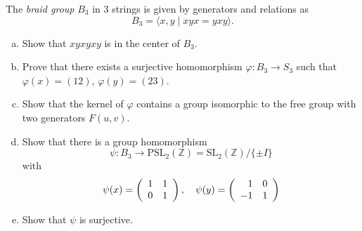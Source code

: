 \documentclass{article}
\newcounter{Problem}
\newenvironment{Problem}{\begin{Exercise}[name={Problem},
                                          counter={Problem}]}
                        {\end{Exercise}}
\begin{document}
\begin{Problem}
The \emph{braid group} $B_3$ in 3 strings is given by generators and
relations as
$$
B_3 = \langle x, y \mid xyx = yxy \rangle.
$$

\begin{enumerate}[(a)]
  \item{
    Show that $xyxyxy$ is in the center of $B_3$.
  }
  \item{
    Prove that there exists a surjective homomorphism
    $\varphi : B_3 \to S_3$ such that $\varphi(x) = (12)$,
    $\varphi(y) = (23)$.
  }
  \item{
    Show that the kernel of $\varphi$ contains a group isomorphic to
    the free group with two generators $F(u,v)$.
  }
  \item{
    Show that there is a group homomorphism
    $$
    \psi : B_3
       \to \mathrm{PSL}_2(\mathbb{Z})
         = \mathrm{SL}_2(\mathbb{Z}) / \{ \pm I \}
    $$
    with
    $$
    \psi(x) =
    \left(\begin{array}{r r}
      1 & 1 \\
      0 & 1
    \end{array}\right), \quad
    \psi(y) =
    \left(\begin{array}{r r}
      1 & 0 \\
     -1 & 1
    \end{array}\right)
    $$
  }
  \item{
    Show that $\psi$ is surjective.
  }
\end{enumerate}

\end{Problem}
\end{document}
